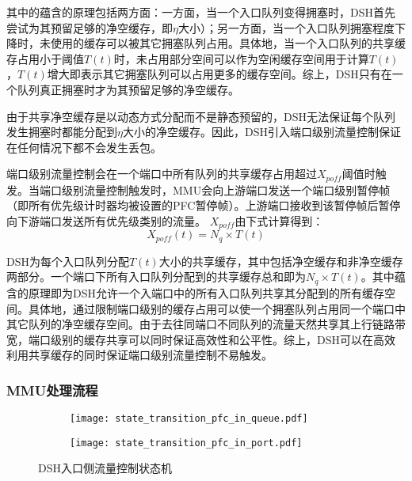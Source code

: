 其中的蕴含的原理包括两方面：一方面，当一个入口队列变得拥塞时，DSH首先尝试为其预留足够的净空缓存，即$\eta$大小）；另一方面，当一个入口队列拥塞程度下降时，未使用的缓存可以被其它拥塞队列占用。具体地，当一个入口队列的共享缓存占用小于阈值$T(t)$时，未占用部分空间可以作为空闲缓存空间用于计算$T(t)$，$T(t)$增大即表示其它拥塞队列可以占用更多的缓存空间。综上，DSH只有在一个队列真正拥塞时才为其预留足够的净空缓存。

由于共享净空缓存是以动态方式分配而不是静态预留的，DSH无法保证每个队列发生拥塞时都能分配到$\eta$大小的净空缓存。因此，DSH引入端口级别流量控制保证在任何情况下都不会发生丢包。

端口级别流量控制会在一个端口中所有队列的共享缓存占用超过$X_{poff}$阈值时触发。当端口级别流量控制触发时，MMU会向上游端口发送一个端口级别暂停帧（即所有优先级计时器均被设置的PFC暂停帧）。上游端口接收到该暂停帧后暂停向下游端口发送所有优先级类别的流量。
$X_{poff}$由下式计算得到：
\begin{equation}
  X_{poff}(t) = N_q \times T(t)
  \label{eqn:c3:port pause threshold}
\end{equation}

DSH为每个入口队列分配$T(t)$大小的共享缓存，其中包括净空缓存和非净空缓存两部分。一个端口下所有入口队列分配到的共享缓存总和即为$N_q \times T(t)$。其中蕴含的原理即为DSH允许一个入端口中的所有入口队列共享其分配到的所有缓存空间。具体地，通过限制端口级别的缓存占用可以使一个拥塞队列占用同一个端口中其它队列的净空缓存空间。由于去往同端口不同队列的流量天然共享其上行链路带宽，端口级别的缓存共享可以同时保证高效性和公平性。综上，DSH可以在高效利用共享缓存的同时保证端口级别流量控制不易触发。

\subsubsection{MMU处理流程}

\begin{figure}[H]
  \begin{subfigure}[b]{0.49\linewidth}
      \centering
      \texttt{[image: state\_transition\_pfc\_in\_queue.pdf]}
      \label{c3:s3:ss4:fig:sub1:dsh ingress queue state transition}
  \end{subfigure}
  \begin{subfigure}[b]{0.49\linewidth}
      \centering
      \texttt{[image: state\_transition\_pfc\_in\_port.pdf]}
      \label{c3:s3:ss4:fig:sub2:dsh ingress port state transition}
  \end{subfigure}
  \caption{DSH入口侧流量控制状态机}
  \label{c3:s3:ss4:fig:dsh ingress state transition}
\end{figure}

